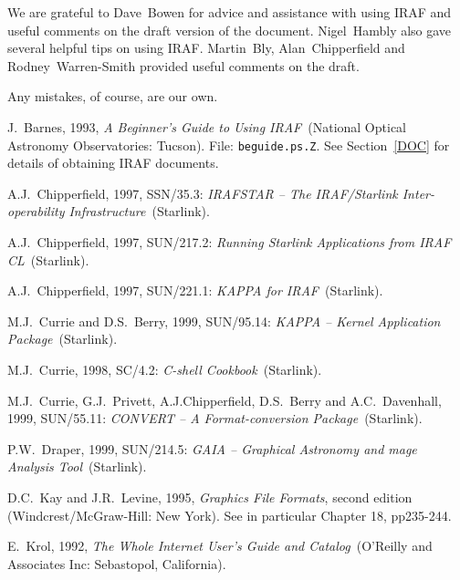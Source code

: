 \documentclass[twoside,11pt]{article}
\newcommand{\xref}[3]{#1}
\begin{document}
We are grateful to Dave~Bowen for advice and assistance with using
IRAF and useful comments on the draft version of the document.
Nigel~Hambly also gave several helpful tips on using IRAF.  Martin~Bly,
Alan~Chipperfield and Rodney~Warren-Smith provided useful comments on the
draft.

Any mistakes, of course, are our own.


% 

\newpage
{}
\begin{thebibliography}{99}

   J.~Barnes, 1993, {\it A Beginner's Guide to
   Using IRAF}\, (National Optical Astronomy Observatories: Tucson).
   File: {\tt beguide.ps.Z}.  See Section~\ref{DOC} for details of
   obtaining IRAF documents.

   A.J.~Chipperfield, 1997, \xref{SSN/35.3}{ssn35}{}: 
   {\it IRAFSTAR -- The IRAF/Starlink Inter-operability Infrastructure}\,
   (Starlink).

   A.J.~Chipperfield, 1997, \xref{SUN/217.2}{sun217}{}:
   {\it Running Starlink Applications from IRAF CL}\, (Starlink).

   A.J.~Chipperfield, 1997, \xref{SUN/221.1}{sun221}{}:
   {\it KAPPA for IRAF}\, (Starlink).

   M.J.~Currie and D.S.~Berry, 1999,
   \xref{SUN/95.14}{sun95}{}: {\it KAPPA -- Kernel Application Package}\,
   (Starlink).

   M.J.~Currie, 1998, \xref{SC/4.2}{sc4}{}:
   {\it C-shell Cookbook}\, (Starlink).

   M.J.~Currie, G.J.~Privett, A.J.Chipperfield,
   D.S.~Berry and A.C.~Davenhall, 1999, \xref{SUN/55.11}{sun55}{}:
   {\it CONVERT -- A Format-conversion Package}\, (Starlink).

   P.W.~Draper, 1999, \xref{SUN/214.5}{sun214}{}:
   {\it GAIA -- Graphical Astronomy and mage Analysis Tool}\, (Starlink).

   D.C.~Kay and J.R.~Levine, 1995, {\it Graphics File
   Formats}, second edition
  \newline (Windcrest/McGraw-Hill: New York).  See in particular
   Chapter 18, pp235-244.

   E.~Krol, 1992, {\it The Whole Internet User's Guide
   and Catalog}\, (O'Reilly and Associates Inc: Sebastopol, California).


\end{thebibliography}
\end{document}

